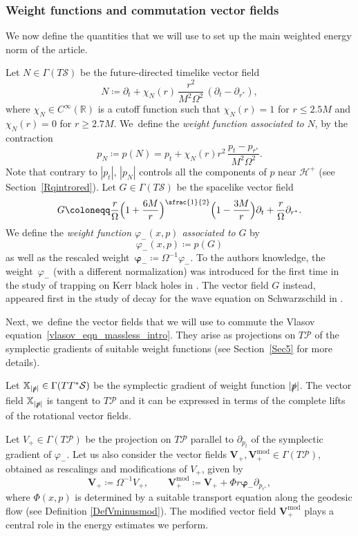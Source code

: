 \documentclass[JEP,XML,SOM,Unicode,published]{cedram}
\theoremstyle{plain}
\theoremstyle{definition}
\newcommand\R{{\mathbb{R}}}
\newcommand\T{{\mathbb{X}}}
\renewcommand\H{{\mathcal{H}^+}}
\begin{document}
\subsubsection{Weight functions and commutation vector fields}

We now define the quantities that we will use to set up the main weighted energy norm of the article.

Let $N\in \Gamma(T\mathcal{S})$ be the future-directed timelike vector field
\[
N \coloneqq \partial_t+ \chi_N (r)\, \frac{r^2}{M^2\Omega^2}\, (\partial_t-\partial_{r^*}),
\]
where $\chi_N \in C^\infty (\R)$ is a cutoff function such that $\chi_N (r)=1$ for $r \leq 2.5M$ and $\chi_N (r) =0$ for $r \geq 2.7M$. We~define the \emph{weight function associated to} $N$, by the contraction
\[
p_N\coloneqq p(N)=p_t+\chi_N (r) r^2 \, \frac{p_t-p_{r^*}}{M^2\Omega^2}.
\]
Note that contrary to $|p_t|$, $|p_N|$ controls all the components of $p$ near $\H$ (see Section~\ref{Rqintrored}). Let $G\in \Gamma(T\mathcal{S})$ be the spacelike vector field
\begin{equation}\label{defG}
G\coloneqq \frac{r}{\Omega}\Bigl(1+\frac{6M}{r}\Bigr)^{\sfrac{1}{2}}\Bigl(1-\frac{3M}{r}\Bigr)\partial_t + \frac{r }{\Omega} \partial_{r^*}.
\end{equation}
We define the \emph{weight function $\varphi_- (x,p)$ associated to} $G$ by
\begin{equation}\label{eq:defvarphiminusintro}
\varphi_-(x,p)\coloneqq p(G)
\end{equation}
as well as the rescaled weight~$\pmb{\varphi}_-\coloneqq\Omega^{-1}\varphi_-$. To the authors knowledge, the weight~\(\varphi_-\) (with a different normalization) was introduced for the first time in the study of trapping on Kerr black holes in \cite{D15}. The vector field \(G\) instead, appeared first in the study of decay for the wave equation on Schwarzschild in \cite{GK23}.

Next, we~define the vector fields that we will use to commute the Vlasov equation~\eqref{vlasov_eqn_massless_intro}. They arise as projections on $T\mathcal{P}$ of the symplectic gradients of suitable weight functions (see Section~\ref{Sec5} for more details).

Let $\T_{|\slashed{p}|} \in \Gamma(TT^*\mathcal{S})$ be the symplectic gradient of weight function $|\slashed{p}|$. The vector field $\T_{|\slashed{p}|}$ is tangent to $T\mathcal{P}$ and it can be expressed in terms of the complete lifts of the rotational vector fields.

Let $V_+\in \Gamma(T\mathcal{P})$ be the projection on $T \mathcal{P}$ parallel to $\partial_{p_t}$ of the symplectic gradient of $\varphi_-$. Let us also consider the vector fields $\pmb{V}_+, \pmb{V}_+^{\mathrm{mod}} \in \Gamma(T \mathcal{P})$, obtained as rescalings and modifications of $V_+$, given by
\[
\pmb{V}_{\! +}\coloneqq \Omega^{-1} V_+,\qquad \pmb{V}_+^{\mathrm{mod}} \coloneqq \pmb{V}_{\! +}+\Phi r \pmb{\varphi}_- \partial_{p_{r^*}},
\]
where $\Phi(x,p)$ is determined by a suitable transport equation along the geodesic flow (see Definition \ref{DefVminusmod}). The modified vector field $\pmb{V}_+^{\mathrm{mod}}$ plays a central role in the energy estimates we perform.
\end{document}
